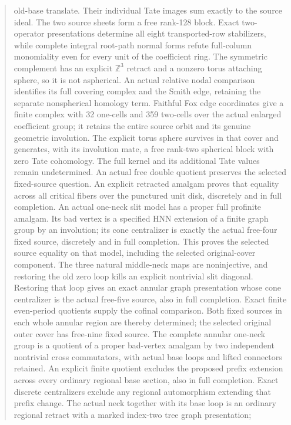 \documentclass[11pt,a4paper]{article}
\begin{document}
\begin{abstract}
old-base translate. Their individual Tate images sum exactly to the
source ideal. The two source sheets form a free rank-128 block.
Exact two-operator presentations determine all eight transported-row
stabilizers, while complete integral root-path normal forms refute
full-column monomiality even for every unit of the coefficient ring.
The symmetric complement has an explicit $\mathbb Z^3$ retract and a
nonzero torus attaching sphere, so it is not aspherical. An actual
relative nodal comparison identifies its full covering complex and the
Smith edge, retaining the separate nonspherical homology term. Faithful
Fox edge coordinates give a finite complex with 32 one-cells and 359
two-cells over the actual enlarged coefficient group; it retains the
entire source orbit and its genuine geometric involution. The explicit
torus sphere survives in that cover and generates, with its involution
mate, a free rank-two spherical block with zero Tate cohomology. The
full kernel and its additional Tate values remain undetermined. An actual
free double quotient preserves the selected fixed-source question.
An explicit retracted amalgam proves that equality across all critical
fibers over the punctured unit disk, discretely and in full completion.
An actual one-neck slit model has a proper full profinite amalgam.
Its bad vertex is a specified HNN extension of a finite graph group by
an involution; its cone centralizer is exactly the actual free-four
fixed source, discretely and in full completion. This proves the selected
source equality on that model, including the selected original-cover
component. The three natural middle-neck maps are noninjective, and
restoring the old zero loop kills an explicit nontrivial slit diagonal.
Restoring that loop gives an exact annular graph presentation whose
cone centralizer is the actual free-five source, also in full completion.
Exact finite even-period quotients supply the cofinal comparison. Both
fixed sources in each whole annular region are thereby determined; the
selected original outer cover has free-nine fixed source. The complete
annular one-neck group is a quotient of a proper bad-vertex amalgam by
two independent nontrivial cross commutators, with actual base loops
and lifted connectors retained. An explicit finite quotient excludes the proposed prefix extension
across every ordinary regional base section, also in full completion.
Exact discrete centralizers exclude any regional automorphism extending
that prefix change. The actual neck together with its base loop is an
ordinary regional retract with a marked index-two tree graph presentation;

\end{abstract}
\end{document}
